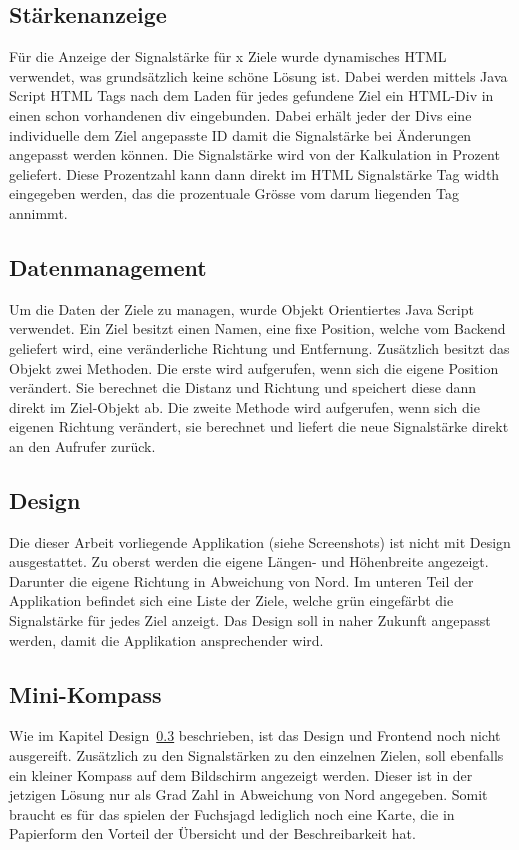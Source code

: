 \subsection{Stärkenanzeige} %
\label{sub:stärkenanzeige}
Für die Anzeige der Signalstärke für x Ziele wurde dynamisches HTML verwendet, was grundsätzlich keine schöne Lösung ist. Dabei werden mittels Java Script HTML Tags nach dem Laden für jedes gefundene Ziel ein HTML-Div in einen schon vorhandenen div eingebunden. Dabei erhält jeder der Divs eine individuelle dem Ziel angepasste ID damit die Signalstärke bei Änderungen angepasst werden können. Die Signalstärke wird von der Kalkulation in Prozent geliefert. Diese Prozentzahl kann dann direkt im HTML Signalstärke Tag width eingegeben werden, das die prozentuale Grösse vom darum liegenden Tag annimmt.

\subsection{Datenmanagement} %
\label{sub:datenmanagement}
Um die Daten der Ziele zu managen, wurde Objekt Orientiertes Java Script verwendet. Ein Ziel besitzt einen Namen, eine fixe Position, welche vom Backend geliefert wird, eine veränderliche Richtung und Entfernung. Zusätzlich besitzt das Objekt zwei Methoden. Die erste wird aufgerufen, wenn sich die eigene Position verändert. Sie berechnet die Distanz und Richtung und speichert diese dann direkt im Ziel-Objekt ab. Die zweite Methode wird aufgerufen, wenn sich die eigenen Richtung verändert, sie berechnet und liefert die neue Signalstärke direkt an den Aufrufer zurück. 

\subsection{Design} %
\label{sub:design}
Die dieser Arbeit vorliegende Applikation (siehe Screenshots) ist nicht mit Design ausgestattet. Zu oberst werden die eigene Längen- und Höhenbreite angezeigt. Darunter die eigene Richtung in Abweichung von Nord. 
Im unteren Teil der Applikation befindet sich eine Liste der Ziele, welche grün eingefärbt die Signalstärke für jedes Ziel anzeigt. Das Design soll in naher Zukunft angepasst werden, damit die Applikation ansprechender wird.

\subsection{Mini-Kompass} %
\label{sub:mini_kompass}
Wie im Kapitel Design~\ref{sub:design} beschrieben, ist das Design und Frontend noch nicht ausgereift. Zusätzlich zu den Signalstärken zu den einzelnen Zielen, soll ebenfalls ein kleiner Kompass auf dem Bildschirm angezeigt werden. Dieser ist in der jetzigen Lösung nur als Grad Zahl in Abweichung von Nord angegeben. Somit braucht es für das spielen der Fuchsjagd lediglich noch eine Karte, die in Papierform den Vorteil der Übersicht und der Beschreibarkeit hat.

